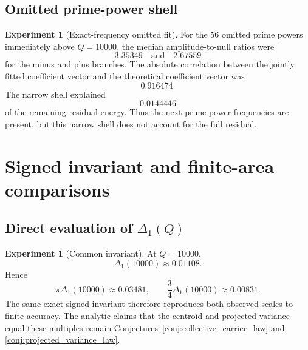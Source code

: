 \documentclass[11pt]{amsart}
\numberwithin{equation}{section}
\theoremstyle{plain}
\theoremstyle{definition}
\newtheorem{experiment}[theorem]{Experiment}
\theoremstyle{remark}
\newcommand{\1}{\mathbf{1}}
\begin{document}
\subsection{Omitted prime-power shell}
\label{subsec:numerical_omitted_shell}

\begin{experiment}[Exact-frequency omitted fit]
\label{exp:numerical_omitted_fit_detailed}
For the $56$ omitted prime powers immediately above $Q=10000$, the median
amplitude-to-null ratios were
\begin{equation}
3.35349
\quad\text{and}\quad
2.67559
\label{eq:numerical_omitted_ratios_detailed}
\end{equation}
for the minus and plus branches.  The absolute correlation between the
jointly fitted coefficient vector and the theoretical coefficient vector was
\begin{equation}
0.916474.
\label{eq:numerical_omitted_correlation_detailed}
\end{equation}
The narrow shell explained
\begin{equation}
0.0144446
\label{eq:numerical_omitted_energy_fraction_detailed}
\end{equation}
of the remaining residual energy.  Thus the next prime-power frequencies
are present, but this narrow shell does not account for the full residual.
\end{experiment}

\section{Signed invariant and finite-area comparisons}
\label{sec:numerical_signed_invariant}

\subsection{Direct evaluation of $\Delta_1(Q)$}
\label{subsec:numerical_Delta_evaluation}

\begin{experiment}[Common invariant]
\label{exp:numerical_common_invariant}
At $Q=10000$,
\begin{equation}
\Delta_1(10000)\approx0.01108.
\label{eq:numerical_Delta_detailed}
\end{equation}
Hence
\begin{equation}
\pi\Delta_1(10000)\approx0.03481,
\qquad
\frac34\Delta_1(10000)\approx0.00831.
\label{eq:numerical_Delta_multiples_detailed}
\end{equation}
The same exact signed invariant therefore reproduces both observed scales
to finite accuracy.  The analytic claims that the centroid and projected
variance equal these multiples remain Conjectures~\ref{conj:collective_carrier_law}
and \ref{conj:projected_variance_law}.
\end{experiment}
\end{document}
